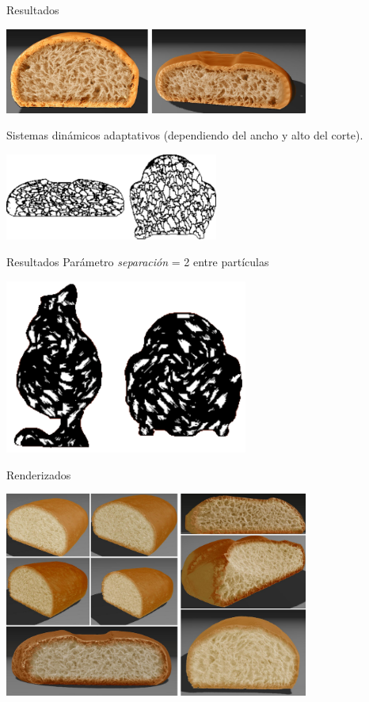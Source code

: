 \documentclass[spanish,unknownkeysallowed]{beamer}
\begin{document}
\begin{frame}{Resultados}
\centerline{\includegraphics[width=10cm]{../figures/Fig11CAVW}}


Sistemas dinámicos adaptativos (dependiendo del ancho y alto del corte).

\centerline{\includegraphics[width=7cm]{../figures/Fig6}}

\end{frame}

\begin{frame}{Resultados}
Parámetro {\em separación} = 2 entre partículas

\centerline{\includegraphics[width=8cm]{../figures/Fig7}}
\end{frame}

\begin{frame}{Renderizados}

\centerline{\includegraphics[width=10cm]{../figures/Fig12CAVW}}
\end{frame}
\end{document}
